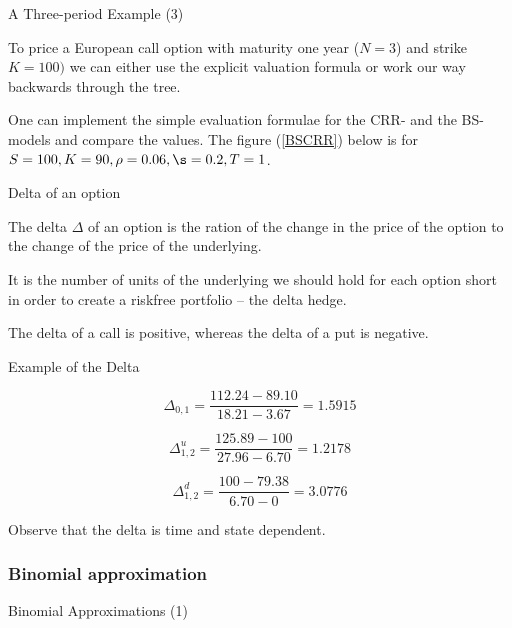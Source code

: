 { A Three-period Example (3)}






	To price a European call option with maturity one year ($N=3$) and
strike $K=100)$ we can either use the explicit valuation formula or work our way backwards through the tree.


	One can implement the simple evaluation formulae for the CRR- and
the BS-models and compare the values. The figure (\ref{BSCRR}) below is for
$S=100, K=90, \rho=0.06, \s=0.2, T=1$.





{Delta  of an option}






	The delta $\Delta$ of an option is the ration of the change in the price of the option to the
change of the price of the underlying.


	It is the number of units of the underlying we should hold for each option short in order to
create a riskfree portfolio -- the delta hedge.


	The delta of a call is positive, whereas the delta of a put is negative.






{Example of the Delta}






	
$$
\Delta_{0,1}=\frac{112.24-89.10}{18.21-3.67}=1.5915
$$


	
$$
\Delta^u_{1,2}=\frac{125.89-100}{27.96-6.70}=1.2178
$$


	
$$
\Delta^d_{1,2}=\frac{100-79.38}{6.70-0}=3.0776
$$


	Observe that the delta is time and state dependent.





\subsubsection{Binomial approximation}

{Binomial Approximations (1)}



